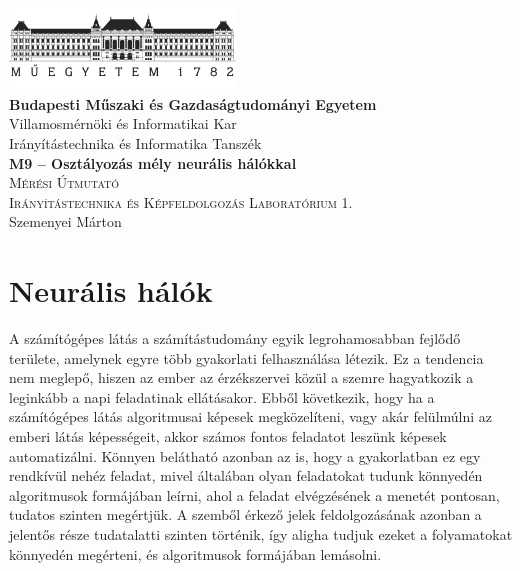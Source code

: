 \documentclass[12pt,a4paper,oneside]{report}             %
\author{\vikauthor}
\title{\viktitle}
\newcommand{\vikauthor}{Szemenyei Márton}
\newcommand{\viktitle}{M9 – Osztályozás mély neurális hálókkal}
\newcommand{\vikdept}{Irányítástechnika és Informatika Tanszék}
\newcommand{\vikdoktipus}{Irányítástechnika és Képfeldolgozás Laboratórium 1.}
\newcommand{\viksubtitle}{Mérési Útmutató}
\newcommand{\hsp}{\hspace{20pt}}
\begin{document}
\onehalfspacing

\begin{titlepage}
\begin{center}
\includegraphics[width=60mm,keepaspectratio]{images/logo.png}\\
\vspace{0.3cm}
\textbf{Budapesti Műszaki és Gazdaságtudományi Egyetem}\\
\textmd{Villamosmérnöki és Informatikai Kar}\\
\textmd{\vikdept}\\[5cm]

\vspace{0.4cm}
{\huge \bfseries \viktitle}\\[2cm]
\textsc{\Large \viksubtitle}\\[1cm]
\textsc{\Large \vikdoktipus}\\[6cm]

\vfill
{\large \vikauthor}
\end{center}
\end{titlepage}


\singlespacing
\tableofcontents\thispagestyle{fancy}
\titleformat{\chapter}[hang]{\Huge\bfseries}{\thechapter\hsp}{0pt}{\Huge\bfseries}
\onehalfspacing

\chapter{Neurális hálók}

A számítógépes látás a számítástudomány egyik legrohamosabban fejlődő területe, amelynek egyre több gyakorlati felhasználása létezik. Ez a tendencia nem meglepő, hiszen az ember az érzékszervei közül a szemre hagyatkozik a leginkább a napi feladatinak ellátásakor. Ebből következik, hogy ha a számítógépes látás algoritmusai képesek megközelíteni, vagy akár felülmúlni az emberi látás képességeit, akkor számos fontos feladatot leszünk képesek automatizálni. Könnyen belátható azonban az is, hogy a gyakorlatban ez egy rendkívül nehéz feladat, mivel általában olyan feladatokat tudunk könnyedén algoritmusok formájában leírni, ahol a feladat elvégzésének a menetét pontosan, tudatos szinten megértjük. A szemből érkező jelek feldolgozásának azonban a jelentős része tudatalatti szinten történik, így aligha tudjuk ezeket a folyamatokat könnyedén megérteni, és algoritmusok formájában lemásolni.
\end{document}
